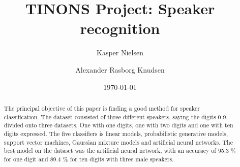 

\usepackage[footnote,draft,english,silent,nomargin]{fixme}



\title{TINONS Project: Speaker recognition}

\author{Kasper Nielsen}%
\author{Alexander Rasborg Knudsen}%
\date{\today} %

\begin{abstract}
\bigskip
The principal objective of this paper is finding a good method for speaker classification. 
The dataset consisted of three different speakers, saying the digits 0-9, divided onto
three datasets. 
One with one digits, one with two digits and one with ten digits expressed.
The five classifiers is linear models, probabilistic generative models, support vector machines, Gaussian mixture models and artificial neural networks.
The best model on the dataset was the artificial neural network, with an accuracy of 95.3 \% for one digit and 89.4 \% for ten digits with three male speakers. 
\end{abstract}

\maketitle
\noindent







	 


	







\renewcommand{\bibname}{2 Reference Document}





